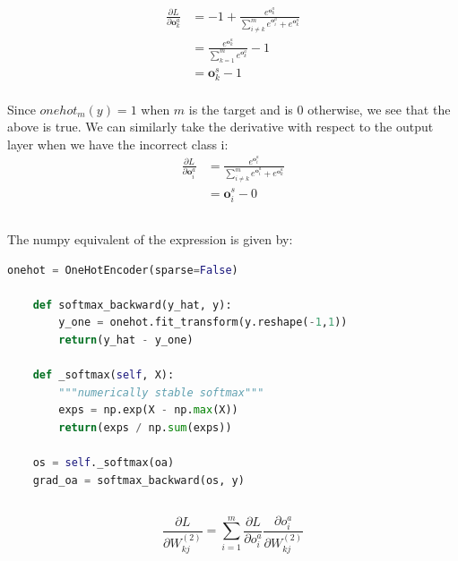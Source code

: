 \documentclass[reqno]{amsart}
\theoremstyle{definition}
\theoremstyle{remark}
\numberwithin{equation}{section}
\begin{document}
\begin{align}
    \frac{\partial L}{\partial \mathbf{o}_k^a} &=
        -1 + \frac{e^{\mathbf{o}_k^a}}{\sum_{i \neq k}^m e^{\mathbf{o}_i^a} + e^{\mathbf{o}_k^a}} \\
    &= \frac{e^{\mathbf{o}_k^a}}{\sum_{k=1}^m e^{\mathbf{o}_k^a}} -1 \\
    &= \mathbf{o}^s_k - 1
\end{align} \\

Since $onehot_m(y) = 1$ when $m$ is the target and is $0$ otherwise, we see that the above is true. We can similarly take the derivative with respect to the output layer when we have the incorrect class i: \\

\begin{align}
    \frac{\partial L}{\partial \mathbf{o}_i^a} &=
        \frac{e^{\mathbf{o}_i^a}}{\sum_{i \neq k}^m e^{\mathbf{o}_i^a} + e^{\mathbf{o}_k^a}} \\
    &= \mathbf{o}^s_i - 0
\end{align} 

\subsection{}
The numpy equivalent of the expression is given by:\\


\begin{lstlisting}[language=Python]
    onehot = OneHotEncoder(sparse=False)
    
    def softmax_backward(y_hat, y):
        y_one = onehot.fit_transform(y.reshape(-1,1))
        return(y_hat - y_one)
        
    def _softmax(self, X):
        """numerically stable softmax"""
        exps = np.exp(X - np.max(X))
        return(exps / np.sum(exps))
        
    os = self._softmax(oa)
    grad_oa = softmax_backward(os, y)
\end{lstlisting}


\subsection{}

\begin{equation}
    \frac{\partial L}{\partial W_{kj}^{(2)}} = \sum_{i=1}^m \frac{\partial L}{\partial o_i^a} \frac{\partial o_i^a}{\partial W_{kj}^{(2)}}
\end{equation}
\end{document}
